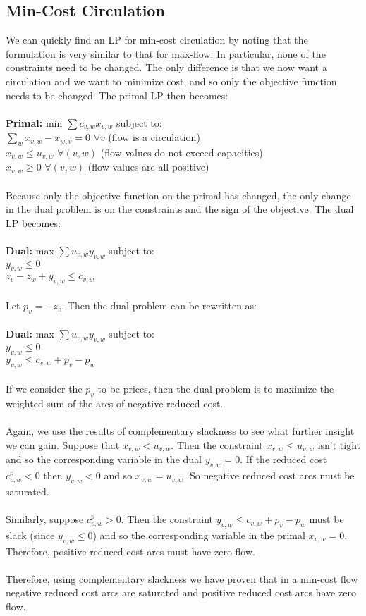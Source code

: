 \documentclass{article}
\begin{document}
\subsection{Min-Cost Circulation}
We can quickly find an LP for min-cost circulation by noting that the formulation is very similar to that for max-flow.  In particular, none of the constraints need to be changed.  The only difference is that we now want a circulation and we want to minimize cost, and so only the objective function needs to be changed.  The primal LP then becomes:\\
\\
\textbf{Primal:}  min $\sum c_{v,w}x_{v,w}$ subject to:\\
 $\sum_{w}x_{v,w} - x_{w,v} = 0$ $\forall v$ (flow is a circulation)\\
 $x_{v,w} \leq u_{v,w}$ $\forall (v,w)$ (flow values do not exceed capacities)\\
 $x_{v,w} \geq 0$  $\forall (v,w)$ (flow values are all positive)\\
\\
Because only the objective function on the primal has changed, the only change in the dual problem is on the constraints and the sign of the objective.  The dual LP becomes:\\
\\
\textbf{Dual:} max $\sum u_{v,w}y_{v,w}$ subject to:\\
$y_{v,w} \leq 0$\\
$z_v - z_w + y_{v,w} \leq c_{v,w}$\\
\\
Let $p_v = - z_v$.  Then the dual problem can be rewritten as:\\
\\
\textbf{Dual:} max $\sum u_{v,w}y_{v,w}$ subject to:\\
$y_{v,w} \leq 0$\\
$y_{v,w} \leq c_{v,w} + p_v - p_w$\\
\\
If we consider the $p_v$ to be prices, then the dual problem is to maximize the weighted sum of the arcs of negative reduced cost.\\
\\
Again, we use the results of complementary slackness to see what further insight we can gain.  Suppose that $x_{v,w} < u_{v,w}$.  Then the constraint $x_{v,w} \leq u_{v,w}$ isn't tight and so the corresponding variable in the dual  $y_{v,w} = 0$.  If the reduced cost $c^p_{v,w} < 0$ then $y_{v,w} < 0$ and so $x_{v,w} = u_{v,w}$.  So negative reduced cost arcs must be saturated.\\
\\
Similarly, suppose $c^p_{v,w} > 0$.  Then the constraint $y_{v,w} \leq c_{v,w} + p_v - p_w$ must be slack (since $y_{v,w} \leq 0$) and so the corresponding variable in the primal $x_{v,w} = 0$.  Therefore, positive reduced cost arcs must have zero flow.\\
\\
Therefore, using complementary slackness we have proven that in a min-cost flow negative reduced cost arcs are saturated and positive reduced cost arcs have zero flow.
\end{document}
